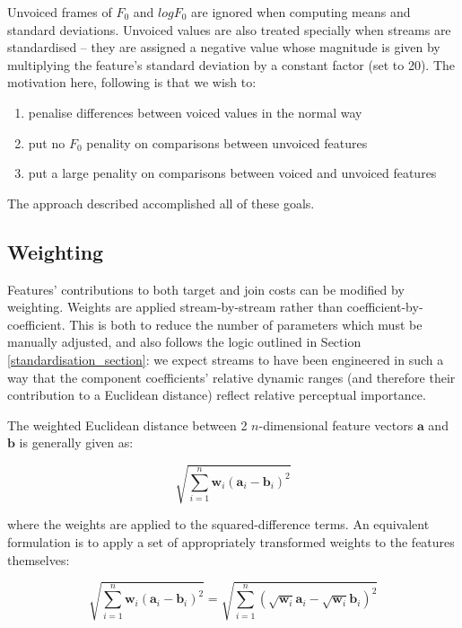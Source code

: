 Unvoiced frames of $F_0$ and $log F_0$ are ignored when computing means and standard deviations. Unvoiced values are also treated specially when streams are standardised -- they are assigned a negative value whose magnitude is given by multiplying the feature's standard deviation by a constant factor (set to 20). The motivation here, following \cite{clark-2007} is that we wish to:
\begin{enumerate}
    \item penalise differences between voiced values in the normal way
    \item put no $F_0$ penality on comparisons between unvoiced features
    \item put a large penality on comparisons between voiced and unvoiced features
\end{enumerate}
The approach described accomplished all of these goals.

\subsection{Weighting}\label{weighting_section}
Features' contributions to both target and join costs can be modified by weighting. Weights are applied stream-by-stream rather than coefficient-by-coefficient. This is both to reduce the number of parameters which must be manually adjusted, and also follows the logic outlined in Section \ref{standardisation_section}: we expect streams to have been engineered in such a way that the component coefficients' relative dynamic ranges (and therefore their contribution to a Euclidean distance) reflect relative perceptual importance.

The weighted Euclidean distance between 2 $n$-dimensional feature vectors $\bm{a}$ and $\bm{b}$ is generally given as:

\begin{equation}
\sqrt{\sum_{i=1}^{n}\bm{w}_{i}(\bm{a}_i - \bm{b}_i)^{2}} 
\end{equation}

\noindent where the weights are applied to the squared-difference terms. An equivalent formulation is to apply a set of appropriately transformed weights to the features themselves:


\begin{equation}
\sqrt{\sum_{i=1}^{n}\bm{w}_{i}(\bm{a}_i - \bm{b}_i)^{2}} = \sqrt{\sum_{i=1}^{n}(\sqrt{\bm{w}_{i}}\bm{a}_i - \sqrt{\bm{w}_{i}}\bm{b}_i)^{2}}
\end{equation}

